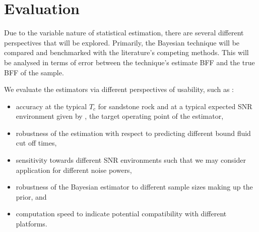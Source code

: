 \chapter{Evaluation}\label{C:evaluation}
Due to the variable nature of statistical estimation, there are several different perspectives that will be explored. Primarily, the Bayesian technique will be compared and benchmarked with the literature's competing methods. This will be analysed in terms of error between the technique's estimate BFF and the true BFF of the sample.

We evaluate the estimators via different perspectives of usability, such as : 
\begin{itemize}
    \item accuracy at the typical $T_c$ for sandstone rock and at a typical expected SNR environment given by \cite{GruberT2Estimation2013}, the target operating point of the estimator, 
    \item robustness of the estimation with respect to predicting different bound fluid cut off times, 
    \item sensitivity towards different SNR environments such that we may consider application for different noise powers, 
    \item robustness of the Bayesian estimator to different sample sizes making up the prior, and
    \item computation speed to indicate potential compatibility with different platforms.
\end{itemize}

